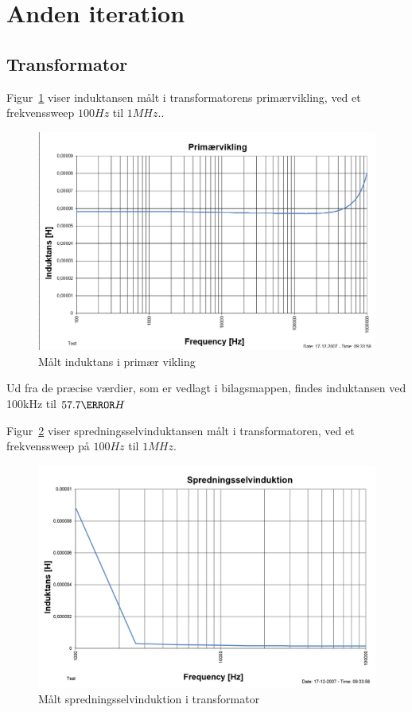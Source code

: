\section{Anden iteration}

\subsection{Transformator}
Figur~\ref{fig: Primarinduktans} viser induktansen målt i transformatorens primærvikling, ved et frekvenssweep $100Hz$ til $1MHz$.. 
\begin{figure}[H]
	\center
	\includegraphics[max width=0.7\linewidth]{../dokumentation/tex/2iteration/billeder/Primarinduktans.png}
	\caption{Målt induktans i primær vikling}
	\label{fig: Primarinduktans}
\end{figure}
Ud fra de præcise værdier, som er vedlagt i bilagsmappen, findes induktansen ved 100kHz til $57.7\micro H$

Figur~\ref{fig: leakageinductance} viser spredningsselvinduktansen målt i transformatoren, ved et frekvenssweep på $100Hz$ til $1MHz$.
\begin{figure}[H]
	\center
	\includegraphics[max width=0.7\linewidth]{../dokumentation/tex/2iteration/billeder/Spredningsselvinduktion.png}
	\caption{Målt spredningsselvinduktion i transformator}
	\label{fig: leakageinductance}
\end{figure}

